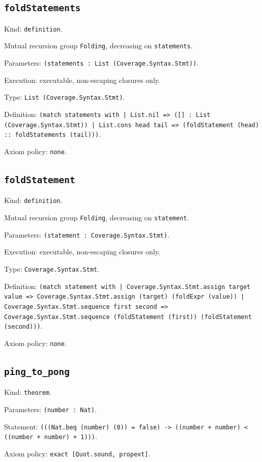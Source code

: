 \documentclass[11pt]{article}
\begin{document}
\subsection*{\texttt{foldStatements}}
\noindent Kind: \texttt{definition}.\par
\noindent Mutual recursion group \texttt{Folding}, decreasing on \texttt{statements}.\par
\noindent Parameters: \texttt{(statements : List (Coverage.Syntax.Stmt))}.\par
\noindent Execution: executable, non-escaping closures only.\par
\noindent Type: \texttt{List (Coverage.Syntax.Stmt)}.\par
\noindent Definition: \texttt{(match statements with | List.nil => ([] : List (Coverage.Syntax.Stmt)) | List.cons head tail => (foldStatement (head) :: foldStatements (tail)))}.\par
\noindent Axiom policy: \texttt{none}.\par
\subsection*{\texttt{foldStatement}}
\noindent Kind: \texttt{definition}.\par
\noindent Mutual recursion group \texttt{Folding}, decreasing on \texttt{statement}.\par
\noindent Parameters: \texttt{(statement : Coverage.Syntax.Stmt)}.\par
\noindent Execution: executable, non-escaping closures only.\par
\noindent Type: \texttt{Coverage.Syntax.Stmt}.\par
\noindent Definition: \texttt{(match statement with | Coverage.Syntax.Stmt.assign target value => Coverage.Syntax.Stmt.assign (target) (foldExpr (value)) | Coverage.Syntax.Stmt.sequence first second => Coverage.Syntax.Stmt.sequence (foldStatement (first)) (foldStatement (second)))}.\par
\noindent Axiom policy: \texttt{none}.\par
\subsection*{\texttt{ping\_to\_pong}}
\noindent Kind: \texttt{theorem}.\par
\noindent Parameters: \texttt{(number : Nat)}.\par
\noindent Statement: \texttt{(((Nat.beq (number) (0)) = false) -> ((number + number) < ((number + number) + 1)))}.\par
\noindent Axiom policy: \texttt{exact [Quot.sound, propext]}.\par
\end{document}
